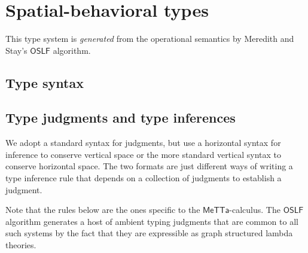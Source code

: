 \section{Spatial-behavioral types}

This type system is \emph{generated} from the operational semantics by
Meredith and Stay's $\mathsf{OSLF}$ algorithm.

\subsection{Type syntax}

\subsection{Type judgments and type inferences}

We adopt a standard syntax for judgments, but use a horizontal syntax
for inference to conserve vertical space or the more standard vertical
syntax to conserve horizontal space. The two formats are just
different ways of writing a type inference rule that depends on a
collection of judgments to establish a judgment.

Note that the rules below are the ones specific to the
$\mathsf{MeTTa}$-calculus. The $\mathsf{OSLF}$ algorithm generates a
host of ambient typing judgments that are common to all such systems
by the fact that they are expressible as graph structured lambda
theories.


